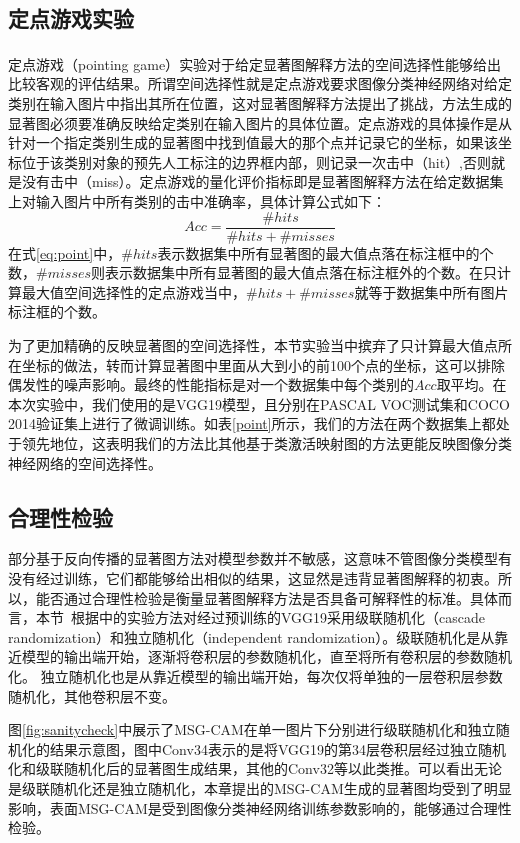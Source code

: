 	\subsection{定点游戏实验}
	定点游戏（pointing game）\textsuperscript{\cite{zhang2018top}}实验对于给定显著图解释方法的空间选择性能够给出比较客观的评估结果。所谓空间选择性就是定点游戏要求图像分类神经网络对给定类别在输入图片中指出其所在位置，这对显著图解释方法提出了挑战，方法生成的显著图必须要准确反映给定类别在输入图片的具体位置。定点游戏的具体操作是从针对一个指定类别生成的显著图中找到值最大的那个点并记录它的坐标，如果该坐标位于该类别对象的预先人工标注的边界框内部，则记录一次击中（hit）,否则就是没有击中（miss）。定点游戏的量化评价指标即是显著图解释方法在给定数据集上对输入图片中所有类别的击中准确率，具体计算公式如下：
	\begin{equation}
		Acc=\frac{\#hits}{\#hits+\#misses}
		\label{eq:point}
	\end{equation}
	在式\ref{eq:point}中，$\#hits$表示数据集中所有显著图的最大值点落在标注框中的个数，$\#misses$则表示数据集中所有显著图的最大值点落在标注框外的个数。在只计算最大值空间选择性的定点游戏当中，$\#hits+\#misses$就等于数据集中所有图片标注框的个数。
	
	为了更加精确的反映显著图的空间选择性，本节实验当中摈弃了只计算最大值点所在坐标的做法，转而计算显著图中里面从大到小的前100个点的坐标，这可以排除偶发性的噪声影响。最终的性能指标是对一个数据集中每个类别的$Acc$取平均。在本次实验中，我们使用的是VGG19模型，且分别在PASCAL VOC测试集和COCO 2014验证集上进行了微调训练。如表\ref{point}所示，我们的方法在两个数据集上都处于领先地位，这表明我们的方法比其他基于类激活映射图的方法更能反映图像分类神经网络的空间选择性。
	
	\subsection{合理性检验}
	部分基于反向传播的显著图方法对模型参数并不敏感，这意味不管图像分类模型有没有经过训练，它们都能够给出相似的结果，这显然是违背显著图解释的初衷。所以，能否通过合理性检验是衡量显著图解释方法是否具备可解释性的标准。具体而言，本节~\cite{zhang2018top}根据中的实验方法对经过预训练的VGG19采用级联随机化（cascade randomization）和独立随机化（independent randomization）。级联随机化是从靠近模型的输出端开始，逐渐将卷积层的参数随机化，直至将所有卷积层的参数随机化。 独立随机化也是从靠近模型的输出端开始，每次仅将单独的一层卷积层参数随机化，其他卷积层不变。
	
	图\ref{fig:sanitycheck}中展示了MSG-CAM在单一图片下分别进行级联随机化和独立随机化的结果示意图，图中Conv34表示的是将VGG19的第34层卷积层经过独立随机化和级联随机化后的显著图生成结果，其他的Conv32等以此类推。可以看出无论是级联随机化还是独立随机化，本章提出的MSG-CAM生成的显著图均受到了明显影响，表面MSG-CAM是受到图像分类神经网络训练参数影响的，能够通过合理性检验。
	
